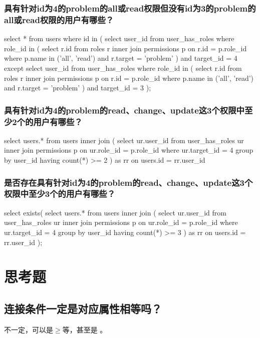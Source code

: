 \documentclass{ctexrep}
\begin{document}
\subsubsection*{具有针对id为4的problem的all或read权限但没有id为3的problem的all或read权限的用户有哪些？}
\begin{run}
    select * from users where id in (
        select user_id from user_has_roles where role_id in (
            select r.id from roles r 
            inner join permissions p on r.id = p.role_id 
            where p.name in ('all', 'read') and r.target = 'problem'
        ) and target_id = 4
        except
        select user_id from user_has_roles where role_id in (
            select r.id from roles r 
            inner join permissions p on r.id = p.role_id 
            where p.name in ('all', 'read') and r.target = 'problem'
        ) and target_id = 3
    );
\end{run}
\subsubsection*{具有针对id为4的problem的read、change、update这3个权限中至少2个的用户有哪些？}
\begin{run}
    select users.* from users inner join (
        select ur.user_id from user_has_roles ur
        inner join permissions p on ur.role_id = p.role_id
        where ur.target_id = 4 group by user_id having count(*) >= 2
    ) as rr on users.id = rr.user_id
\end{run}
\subsubsection*{是否存在具有针对id为4的problem的read、change、update这3个权限中至少3个的用户有哪些？}
\begin{run}
    select exists(
        select users.* from users inner join (
            select ur.user_id from user_has_roles ur
            inner join permissions p on ur.role_id = p.role_id
            where ur.target_id = 4 group by user_id having count(*) >= 3
        ) as rr on users.id = rr.user_id
    );
\end{run}
\section{思考题}
\subsection*{连接条件一定是对应属性相等吗？}
不一定，可以是$\ge$等，甚至是 。
\end{document}
